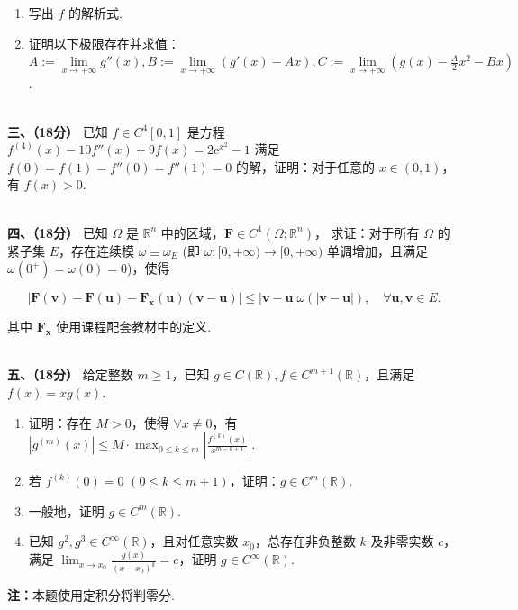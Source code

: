 \begin{enumerate}[label=(\arabic*)]
    \item 写出 $f$ 的解析式.
    \item 证明以下极限存在并求值：$A:=\lim\limits_{x\to+\infty}g''(x),B:=\lim\limits_{x\to+\infty}\left(g'(x)-Ax\right),C:=\lim\limits_{x\to+\infty}\left(g(x)-\frac A2x^2-Bx\right)$.
\end{enumerate}
\\
\textbf{三、（18分）}
已知 $f\in C^4[0,1]$ 是方程 $f^{(4)}(x)-10f''(x)+9f(x)=2\mathrm e^{x^2}-1$ 满足 $f(0)=f(1)=f''(0)=f''(1)=0$ 的解，证明：对于任意的 $x\in(0,1)$，有 $f(x)>0$.

\\
\textbf{四、（18分）}
已知 $\Omega$ 是 $\mathbb R^n$ 中的区域，$\mathbf F\in C^1(\Omega;\mathbb R^n)$，
求证：对于所有 $\Omega$ 的紧子集 $E$，存在连续模 $\omega\equiv\omega_E$ 
(即 $\omega:[0,+\infty)\to[0,+\infty)$ 单调增加，且满足 $\omega(0^+)=\omega(0)=0$)，使得

$$|\mathbf F(\boldsymbol{v})-\mathbf F(\boldsymbol{u})
-\mathbf F_{\boldsymbol{x}}(\boldsymbol{u})(\boldsymbol{v}-\boldsymbol{u})|
\leq|\boldsymbol{v}-\boldsymbol{u}|\omega(|\boldsymbol{v}-\boldsymbol{u}|),
\quad\forall \boldsymbol{u},\boldsymbol{v}\in E.$$

其中 $\mathbf F_{\boldsymbol{x}}$ 使用课程配套教材中的定义.

\\
\textbf{五、（18分）}
给定整数 $m\geq1$，已知 $g\in C(\mathbb R),f\in C^{m+1}(\mathbb R)$，且满足 $f(x)=xg(x)$.

\begin{enumerate}[label=(\arabic*)]
    \item 证明：存在 $M>0$，使得 $\forall x\neq0$，有 $\displaystyle\left|g^{(m)}(x)\right|\leq M\cdot\max_{0\leq k\leq m}\left|\frac{f^{(k)}(x)}{x^{m-k+1}}\right|$.
    \item 若 $f^{(k)}(0)=0$ $(0\leq k\leq m+1)$，证明：$g\in C^m(\mathbb R)$.
    \item 一般地，证明 $g\in C^m(\mathbb R)$.
    \item 已知 $g^2,g^3\in C^\infty(\mathbb R)$，且对任意实数 $x_0$，总存在非负整数 $k$ 及非零实数 $c$，
    满足 $\displaystyle\lim_{x\to x_0}\frac{g(x)}{(x-x_0)^k}=c$，证明 $g\in C^\infty(\mathbb R)$.
\end{enumerate}

\textbf{注：}本题使用定积分将判零分.

